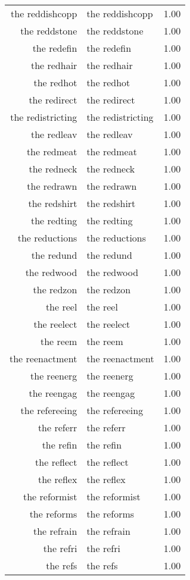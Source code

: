 \begin{table}[ht]
\begin{tabular}{rlr}
  the reddishcopp & the reddishcopp & 1.00 \\ 
  the reddstone & the reddstone & 1.00 \\ 
  the redefin & the redefin & 1.00 \\ 
  the redhair & the redhair & 1.00 \\ 
  the redhot & the redhot & 1.00 \\ 
  the redirect & the redirect & 1.00 \\ 
  the redistricting & the redistricting & 1.00 \\ 
  the redleav & the redleav & 1.00 \\ 
  the redmeat & the redmeat & 1.00 \\ 
  the redneck & the redneck & 1.00 \\ 
  the redrawn & the redrawn & 1.00 \\ 
  the redshirt & the redshirt & 1.00 \\ 
  the redting & the redting & 1.00 \\ 
  the reductions & the reductions & 1.00 \\ 
  the redund & the redund & 1.00 \\ 
  the redwood & the redwood & 1.00 \\ 
  the redzon & the redzon & 1.00 \\ 
  the reel & the reel & 1.00 \\ 
  the reelect & the reelect & 1.00 \\ 
  the reem & the reem & 1.00 \\ 
  the reenactment & the reenactment & 1.00 \\ 
  the reenerg & the reenerg & 1.00 \\ 
  the reengag & the reengag & 1.00 \\ 
  the refereeing & the refereeing & 1.00 \\ 
  the referr & the referr & 1.00 \\ 
  the refin & the refin & 1.00 \\ 
  the reflect & the reflect & 1.00 \\ 
  the reflex & the reflex & 1.00 \\ 
  the reformist & the reformist & 1.00 \\ 
  the reforms & the reforms & 1.00 \\ 
  the refrain & the refrain & 1.00 \\ 
  the refri & the refri & 1.00 \\ 
  the refs & the refs & 1.00 \\ 

\end{tabular}
\end{table}
